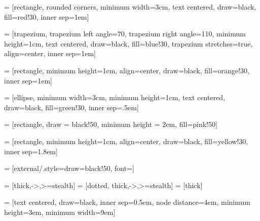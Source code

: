 \usepackage{tikz}
\usepackage{xparse}
\usetikzlibrary{positioning, fit, backgrounds, shapes, arrows.meta}


 = [rectangle, rounded corners, minimum width=3cm, text centered,
 draw=black, fill=red!30, inner sep=1em]

 = [trapezium, trapezium left angle=70, trapezium right angle=110, 
 minimum height=1cm, text centered, draw=black, fill=blue!30, trapezium stretches=true,
 align=center, inner sep=1em] 

 = [rectangle, minimum height=1cm, align=center,
      draw=black, fill=orange!30, inner sep=1em]

 = [ellipse, minimum width=3cm, minimum height=1cm, text centered, draw=black,
 fill=green!30, inner sep=.5em]

 = [rectangle, draw = black!50, minimum height = 2em, fill=pink!50]

 = [rectangle, minimum height=1cm, align=center, draw=black, fill=yellow!30, inner sep=1.8em]

 = [external/.style={draw=black!50}, font={\fontsize{13pt}{12}\selectfont}]

 = [thick,->,>=stealth]
 = [dotted, thick,->,>=stealth]
 = [thick]

\NewDocumentCommand{}
\newcommand\insertitem[1]{\item #1}

\NewDocumentCommand{}

\newcommand{\shortarrowlength}{3.1em}

 = [text centered, draw=black, inner sep=0.5em, node
distance=4em, minimum height=3em, minimum width=9em]

